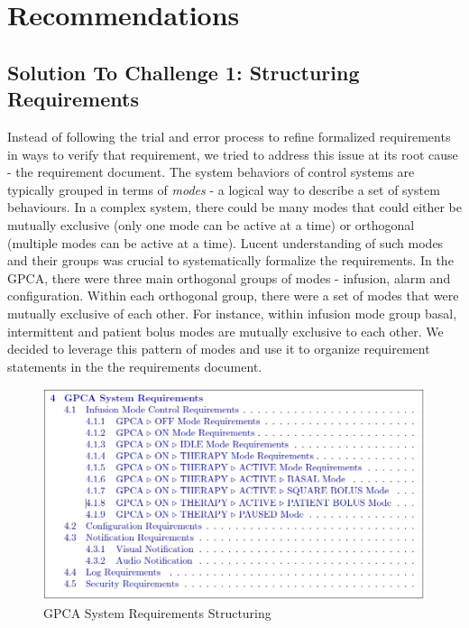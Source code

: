 \section{Recommendations}
\label{sec:recommendations}

\subsection {Solution To Challenge 1: Structuring Requirements}

Instead of following the trial and error process to refine formalized requirements in ways to verify that requirement, we tried to address this issue at its root cause - the requirement document. The system behaviors of control systems are typically grouped in terms of \emph{modes} - a logical way to describe a set of system behaviours. In a complex system, there could be many modes that could either be mutually exclusive (only one mode can be active at a time) or orthogonal (multiple modes can be active at a time). Lucent understanding of such modes and their groups was crucial to systematically formalize the requirements. In the GPCA, there were three main orthogonal groups of modes - infusion, alarm and configuration. Within each orthogonal group, there were a set of modes that were mutually exclusive of each other. For instance, within infusion mode group basal, intermittent and patient bolus modes are mutually exclusive to each other. We decided to leverage this pattern of modes and use it to organize requirement statements in the the requirements document.

 \begin{figure}[h!]
    \centering
    \includegraphics[width=\columnwidth]{images/structuring.jpg}
    \caption{GPCA System Requirements Structuring}
    \label{fig:gpca-requirements}
 \end{figure}

